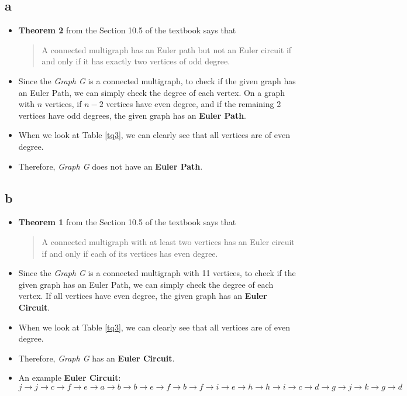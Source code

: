 \documentclass[11pt]{article}
\begin{document}
\subsection*{a}
\begin{itemize}
    \item  \textbf{Theorem 2} from the Section 10.5 of the textbook says that 
    \begin{quote}
        A connected multigraph has an Euler path but not an Euler circuit if and only if it has exactly two vertices of odd degree.
    \end{quote}
    \item Since the \textit{Graph G} is a connected multigraph, to check if the given graph has an Euler Path, we can simply check the degree of each vertex. On a graph with $n$ vertices, if $n-2$ vertices have even degree, and if the remaining 2 vertices have odd degrees, the given graph has an \textbf{Euler Path}. 
    \item When we look at Table \ref{tq3}, we can clearly see that all vertices are of even degree. 
    \item Therefore, \textit{Graph G} does not have an \textbf{Euler Path}. 
\end{itemize}

\subsection*{b}
\begin{itemize}
    \item  \textbf{Theorem 1} from the Section 10.5 of the textbook says that 
    \begin{quote}
        A connected multigraph with at least two vertices has an Euler circuit if and only if each of its vertices has even degree.
    \end{quote}
    \item Since the \textit{Graph G} is a connected multigraph with 11 vertices, to check if the given graph has an Euler Path, we can simply check the degree of each vertex. If all vertices have even degree, the given graph has an \textbf{Euler Circuit}. 
    \item When we look at Table \ref{tq3}, we can clearly see that all vertices are of even degree. 
    \item Therefore, \textit{Graph G} has an \textbf{Euler Circuit}. 
    \item An example \textbf{Euler Circuit}: $ j \rightarrow j \rightarrow c \rightarrow f \rightarrow e \rightarrow a \rightarrow b \rightarrow b \rightarrow e \rightarrow f \rightarrow b \rightarrow f \rightarrow i \rightarrow e \rightarrow h \rightarrow h \rightarrow i \rightarrow c \rightarrow d \rightarrow g \rightarrow j \rightarrow k \rightarrow g \rightarrow d$
\end{itemize}
\end{document}
